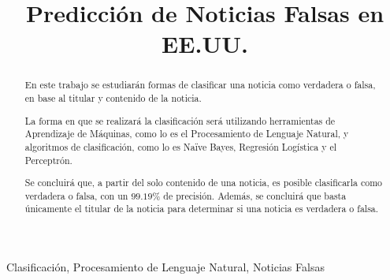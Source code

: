 \documentclass[conference]{IEEEtran}
\begin{document}
\title{Predicción de Noticias Falsas en EE.UU.}

\author{
\and
{}
\and
{}
}

\def\escala{0.45}

\maketitle

\begin{abstract}
En este trabajo se estudiarán formas de clasificar una noticia como verdadera o falsa, en base al titular y contenido de la noticia. 

La forma en que se realizará la clasificación será utilizando herramientas de Aprendizaje de Máquinas, como lo es el Procesamiento de Lenguaje Natural, y algoritmos de clasificación, como lo es Naïve Bayes, Regresión Logística y el Perceptrón.

Se concluirá que, a partir del solo contenido de una noticia, es posible clasificarla como verdadera o falsa, con un $99.19\%$ de precisión. Además, se concluirá que basta únicamente el titular de la noticia para determinar si una noticia es verdadera o falsa.
\end{abstract}

\begin{IEEEkeywords}
Clasificación, Procesamiento de Lenguaje Natural, Noticias Falsas
\end{IEEEkeywords}



% 

% 

% 

% 

% 
\end{document}
